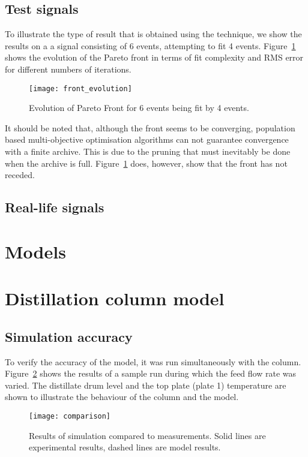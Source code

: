 \subsection{Test signals}
To illustrate the type of result that is obtained using the technique, we show the results on a a signal consisting of 6 events, attempting to fit 4 events.  
Figure~\ref{fig:front_evolution} shows the evolution of the Pareto front in terms of fit complexity and RMS error for different numbers of iterations.

\begin{figure}[htbp]
  \centering
  \texttt{[image: front\_evolution]}
  \caption{Evolution of Pareto Front for 6 events being fit by 4 events.}
  \label{fig:front_evolution}
\end{figure}

It should be noted that, although the front seems to be converging, population based multi-objective optimisation algorithms can not guarantee convergence with a finite archive.  
This is due to the pruning that must inevitably be done when the archive is full.
Figure~\ref{fig:front_evolution} does, however, show that the front has not receded.

\subsection{Real-life signals}


\section{Models}

\section{Distillation column model}
\subsection{Simulation accuracy}
To verify the accuracy of the model, it was run simultaneously with the column.  
Figure~\ref{fig:comparison} shows the results of a sample run during which the feed flow rate was varied.  
The distillate drum level and the top plate (plate 1) temperature are shown to illustrate the behaviour of the column and the model.

\label{sec:results}
\begin{figure}[htbp]
  \centering
  \texttt{[image: comparison]}
  \caption{Results of simulation compared to measurements. Solid lines are experimental results, dashed lines are model results.}
  \label{fig:comparison}
\end{figure}


